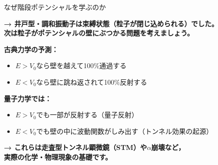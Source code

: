 \documentclass[aspectratio=169, 11pt]{beamer}
\newcommand{\teacher}[1]{{\color{darkblue}\textbf{→ #1}}}
\begin{document}
\begin{frame}{なぜ階段ポテンシャルを学ぶのか}

\teacher{井戸型・調和振動子は\textbf{束縛状態}（粒子が閉じ込められる）でした。\\
次は粒子がポテンシャルの壁に\textbf{ぶつかる}問題を考えましょう。}

\vspace{0.3em}
\textbf{古典力学の予測：}
\begin{itemize}
  \item $E > V_0$なら壁を越えて100\%通過する
  \item $E < V_0$なら壁に跳ね返されて100\%反射する
\end{itemize}

\vspace{0.3em}
\textbf{量子力学では：}
\begin{itemize}
  \item $E > V_0$でも一部が\alert{反射}する（量子反射）
  \item $E < V_0$でも壁の中に波動関数が\alert{しみ出す}（トンネル効果の起源）
\end{itemize}

\teacher{これらは走査型トンネル顕微鏡（STM）や$\alpha$崩壊など，\\
実際の化学・物理現象の基礎です。}
\end{frame}
\end{document}
